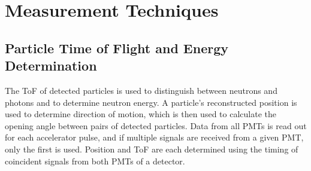 \section{Measurement Techniques}
\subsection{Particle Time of Flight and Energy Determination}
\label{ToF_reconstruction}
The ToF of detected particles is used to distinguish between neutrons and photons and to determine neutron energy.
A particle's reconstructed position is used to determine direction of motion, which is then used to calculate the opening angle between pairs of detected particles.
Data from all PMTs is read out for each accelerator pulse, and if multiple signals are received from a given PMT, only the first is used.
Position and ToF are each determined using the timing of coincident signals from both PMTs of a detector.

